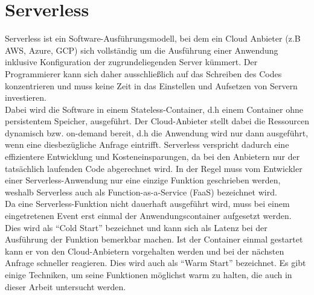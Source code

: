 \section{Serverless}
Serverless ist ein Software-Ausführungsmodell, bei dem ein Cloud Anbieter (z.B AWS, Azure, GCP) sich vollständig um die Ausführung einer Anwendung inklusive Konfiguration der zugrundeliegenden Server kümmert. Der Programmierer kann sich daher ausschließlich auf das Schreiben des Codes konzentrieren und muss keine Zeit in das Einstellen und Aufsetzen von Servern investieren. \\
Dabei wird die Software in einem Stateless-Container, d.h einem Container ohne persistentem Speicher, ausgeführt. Der Cloud-Anbieter stellt dabei die Ressourcen dynamisch bzw. on-demand bereit, d.h die Anwendung wird nur dann ausgeführt, wenn eine diesbezügliche Anfrage eintrifft. Serverless verspricht dadurch eine effizientere Entwicklung und Kosteneinsparungen, da bei den Anbietern nur der tatsächlich laufenden Code abgerechnet wird. In der Regel muss vom Entwickler einer Serverless-Anwendung nur eine einzige Funktion geschrieben werden, weshalb Serverless auch als Function-as-a-Service (FaaS) bezeichnet wird\cite{noauthor_was_2016}. \\
Da eine Serverless-Funktion nicht dauerhaft ausgeführt wird, muss bei einem eingetretenen Event erst einmal der Anwendungscontainer aufgesetzt werden. Dies wird als "`Cold Start"' bezeichnet und kann sich als Latenz bei der Ausführung der Funktion bemerkbar machen. Ist der Container einmal gestartet kann er von den Cloud-Anbietern vorgehalten werden und bei der nächsten Anfrage schneller reagieren. Dies wird auch als "`Warm Start"' bezeichnet\cite{noauthor_was_2016}. Es gibt einige Techniken, um seine Funktionen möglichst warm zu halten, die auch in dieser Arbeit untersucht werden.